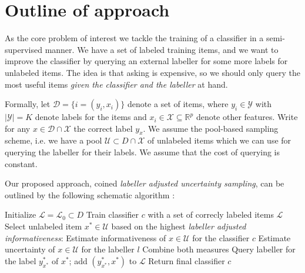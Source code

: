 \documentclass[10pt, onecolumn]{article}
\newcommand{\U}{\mathcal{U}}
\renewcommand{\L}{\mathcal{L}}
\newcommand{\R}{\mathbb{R}}
\newcommand{\X}{\mathcal{X}}
\newcommand{\D}{\mathcal{D}}
\newcommand{\C}{\mathcal{Y}}
\begin{document}





\section{Outline of approach}
\label{sec:outline}

As the core problem of interest we tackle the training of a classifier
in a semi-supervised manner. We have a set of labeled training items,
and we want to improve the classifier by querying an external labeller
for some more labels for unlabeled items. The idea is that asking is
expensive, so we should only query the most useful items \textit{given
the classifier and the labeller} at hand.

Formally, let $\D=\{i=(y_i,x_i)\}$ denote a set of items, where
$y_i\in \C$ with $|\C|=K$ denote labels for the items and $x_i\in
\X\subseteq \R^p$ denote other features. Write for any $x\in\D\cap \X$
the correct label $y_x$. We assume the pool-based sampling scheme,
i.e. we have a pool $\U\subset D\cap \X$ of unlabeled items which we
can use for querying the labeller for their labels. We assume that the
cost of querying is constant. 

Our proposed approach, coined \textit{labeller adjusted uncertainty
  sampling}, can be outlined by the following schematic algorithm
\citep[cf. ``prototypical active learning algorithm''
presented by][]{Olsson@2009}:
\begin{algorithmic}[1]
  \State Initialize $\L = \L_0 \subset D$
    \State Train classifier $c$ with a set of correcly labeled items $\L$
    \State Select unlabeled item $x^* \in \U$ based on the highest
      \textit{labeller adjusted informativeness}:
      \State \qquad Estimate informativeness of $x \in \U$ for the
        classifier $c$ 
      \State \qquad Estimate uncertainty of $x \in \U$ for the
        labeller $l$
      \State \qquad Combine both measures  
    \State Query labeller for the label $y^*_{x^*}$ of $x^*$; add
      $(y^*_{x^*}, x^*)$ to $\L$ 
  \EndWhile
  \State Return final classifier $c$
\end{algorithmic}
\end{document}
